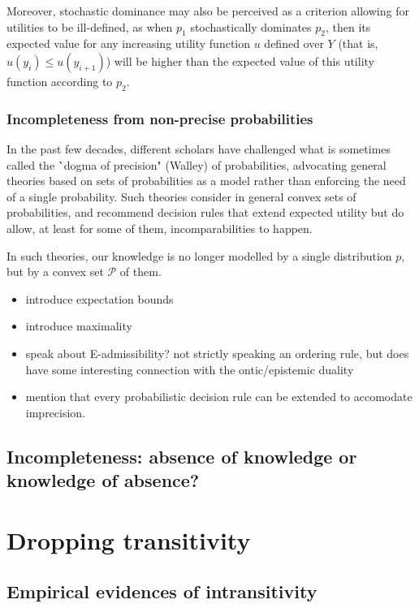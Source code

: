 \documentclass[french, english]{llncs}
\begin{document}
	Moreover, stochastic dominance may also be perceived as a criterion allowing for utilities to be ill-defined, as when $p_1$ stochastically dominates $p_2$, then its expected value for any increasing utility function $u$ defined over $Y$ (that is, $u(y_i) \leq u(y_{i+1})$) will be higher than the expected value of this utility function according to $p_2$. 
		
	\subsubsection{Incompleteness from non-precise probabilities}
	
	In the past few decades, different scholars have challenged what is sometimes called the \``dogma of precision" (Walley) of probabilities, advocating general theories based on sets of probabilities as a model rather than enforcing the need of a single probability. Such theories consider in general convex sets of probabilities, and recommend decision rules that extend expected utility but do allow, at least for some of them, incomparabilities to happen. 
	
	In such theories, our knowledge is no longer modelled by a single distribution $p$, but by a convex set $\mathcal{P}$ of them. 
	
	\begin{itemize}
		\item introduce expectation bounds
		\item introduce maximality
		\item speak about E-admissibility? not strictly speaking an ordering rule, but does have some interesting connection with the ontic/epistemic duality
		\item mention that every probabilistic decision rule can be extended to accomodate imprecision. 
	\end{itemize}
	
    
	
	\subsection{Incompleteness: absence of knowledge or knowledge of absence?}
	
	\section{Dropping transitivity}
	
	\subsection{Empirical evidences of intransitivity}
	
\end{document}
